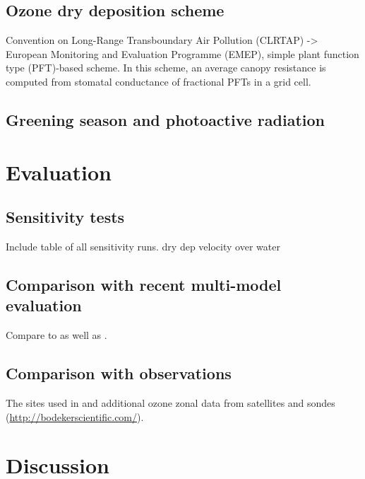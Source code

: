 \documentclass[gmd, manuscript]{copernicus}
\begin{document}
\citet{GMD:Sovde2012,GMD:Lund2018}
\subsection{Ozone dry deposition scheme}
\label{subsec:DryDep}
Convention on Long-Range Transboundary Air Pollution (CLRTAP) -> European Monitoring and Evaluation Programme (EMEP),
simple plant function type (PFT)-based scheme. In this scheme, an average canopy resistance is computed from stomatal conductance of fractional PFTs in a grid cell.
\citep{ACP:Simpson2012} \citet{ICP:MappingManual2017}
\subsection{Greening season and photoactive radiation}

\section{Evaluation}

\subsection{Sensitivity tests}
Include table of all sensitivity runs.
\citep[e.g., $v^\chem{O_3}_{ice/snow} = 1/10000\,\unit{cm s^{-1}}$,][]{ACP:Helmig2007}
dry dep velocity over water \citep{JGR:Helmig2012}

\subsection{Comparison with recent multi-model evaluation}
Compare to \citet{ACP:Hardacre2015} as well as \citet{ACP:Luhar2017}.

\subsection{Comparison with observations}
The sites used in \citet{ACP:Hardacre2015} and additional ozone zonal data from satellites and sondes (\url{http://bodekerscientific.com/}).

\section{Discussion}


\end{document}
